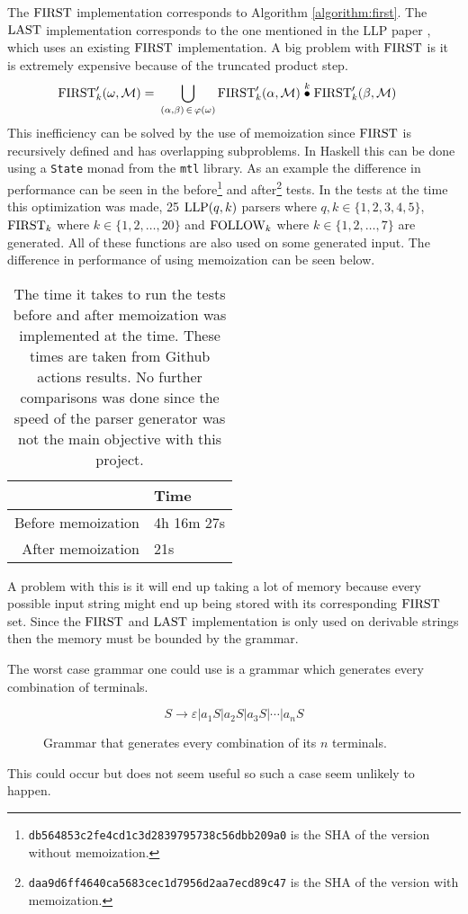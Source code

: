 The $\text{FIRST}$ implementation corresponds to Algorithm \ref{algorithm:first}. The $\text{LAST}$ implementation corresponds to the one mentioned in the LLP paper \cite[12]{Vagner2007}, which uses an existing $\text{FIRST}$ implementation. A big problem with $\text{FIRST}$ is it is extremely expensive because of the truncated product step.
\begin{align*}
    \FIRST'_k(\omega, \mathcal{M}) =&\,\, \bigcup_{(\alpha, \beta) \, \in \, \varphi(\omega)} \FIRST'_k(\alpha, \mathcal{M}) \truncprod{k} \FIRST'_k(\beta, \mathcal{M})
\end{align*}
This inefficiency can be solved by the use of memoization since $\text{FIRST}$ is recursively defined and has overlapping subproblems. In Haskell this can be done using a \lstinline|State| monad from the \lstinline|mtl| library. As an example the difference in performance can be seen in the before\footnote{\texttt{db564853c2fe4cd1c3d2839795738c56dbb209a0} is the SHA of the version without memoization.} and after\footnote{\texttt{daa9d6ff4640ca5683cec1d7956d2aa7ecd89c47} is the SHA of the version with memoization.} tests. In the tests at the time this optimization was made, 25 $\text{LLP}(q,k)$ parsers where $q, k \in \{1, 2, 3, 4, 5\}$, $\text{FIRST}_k$ where $k \in \{1, 2, \dots, 20\}$ and $\text{FOLLOW}_k$ where $k \in \{1, 2, \dots, 7\}$ are generated. All of these functions are also used on some generated input. The difference in performance of using memoization can be seen below. 
\begin{table}[H]
    \centering
    \begin{tabular}{r|l}
         & Time \\ \hline
        Before memoization & 4h 16m 27s \\
        After memoization & 21s
    \end{tabular}
    \caption{The time it takes to run the tests before and after memoization was implemented at the time. These times are taken from Github actions results. No further comparisons was done since the speed of the parser generator was not the main objective with this project.}
\end{table}
\noindent A problem with this is it will end up taking a lot of memory because every possible input string might end up being stored with its corresponding $\text{FIRST}$ set. Since the $\text{FIRST}$ and $\text{LAST}$ implementation is only used on derivable strings then the memory must be bounded by the grammar.

The worst case grammar one could use is a grammar which generates every combination of terminals.
\begin{figure}
    \begin{equation*}
        \label{fig:combination-grammar}
        S \to \varepsilon | a_1 S | a_2 S | a_3 S | \cdots | a_n S
    \end{equation*}
    \caption{Grammar that generates every combination of its $n$ terminals.}    
\end{figure}
This could occur but does not seem useful so such a case seem unlikely to happen.